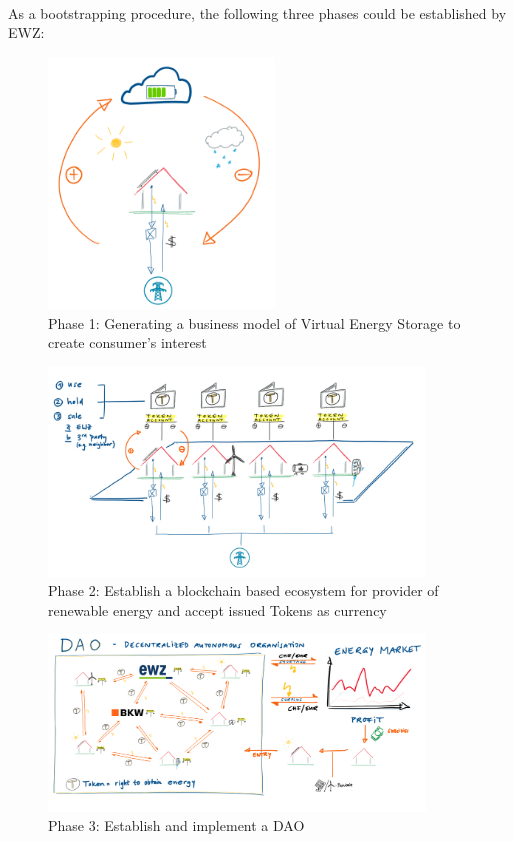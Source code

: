 \documentclass{scrartcl}
\begin{document}
	\paragraph{}
	As a bootstrapping procedure, the following three phases could be established by EWZ:
	
	\begin{figure} [h!]
		\centering
		\includegraphics[width=60mm,scale=0.5]{Phase_1_EnergyCloud.PNG}
		\caption{Phase 1: Generating a business model of Virtual Energy Storage to create consumer’s interest}
	\end{figure}

	\begin{figure} [h!]
		\centering
		\includegraphics[width=100mm,scale=0.5]{Phase_2_EnergyCloud_Blockchain.PNG}
		\caption{Phase 2: Establish a blockchain based ecosystem for provider of renewable energy and accept issued Tokens as currency}
	\end{figure}
	
	\begin{figure} [h!]
		\centering
		\includegraphics[width=100mm,scale=0.5]{Phase_3_DAO.PNG}
		\caption{Phase 3: Establish and implement a DAO}
	\end{figure}
	
\end{document}
